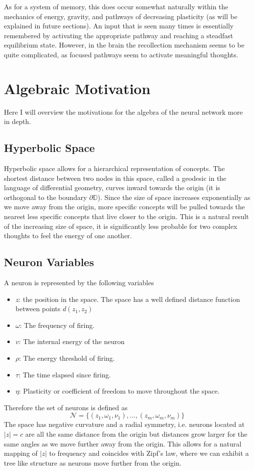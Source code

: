 \documentclass{article}
\begin{document}
As for a system of memory, this does occur somewhat naturally within the mechanics of energy, gravity, and pathways of decreasing plasticity (as will be explained in future sections). An input that is seen many times is essentially remembered by activating the appropriate pathway and reaching a steadfast equilibrium state. However, in the brain the recollection mechanism seems to be quite complicated, as focused pathways seem to activate meaningful thoughts.

\section{Algebraic Motivation}
Here I will overview the motivations for the algebra of the neural network more in depth.
\subsection{Hyperbolic Space}
Hyperbolic space allows for a hierarchical representation of concepts. The shortest distance between two nodes in this space, called a geodesic in the language of differential geometry, curves inward towards the origin (it is orthogonal to the boundary $\partial \mathbb{D}$). Since the size of space increases exponentially as we move away from the origin, more specific concepts will be pulled towards the nearest less specific concepts that live closer to the origin. This is a natural result of the increasing size of space, it is significantly less probable for two complex thoughts to feel the energy of one another.

\subsection{Neuron Variables}
A neuron is represented by the following variables
\begin{itemize}
    \item $z$: the position in the space. The space has a well defined distance function between points $d(z_1,z_2)$
    \item $\omega$: The frequency of firing.
    \item $v$: The internal energy of the neuron
    \item $\rho$: The energy threshold of firing.
    \item $\tau$: The time elapsed since firing.
    \item $\eta$: Plasticity or coefficient of freedom to move throughout the space.
\end{itemize}
Therefore the set of neurons is defined as 
\begin{equation}
    \mathcal{N} = \{ (z_1,\omega_1, \nu_1), ... ,(z_m,\omega_m, \nu_m) \}
\end{equation}
The space has negative curvature and a radial symmetry, i.e. neurons located at $|z| = c$ are all the same distance from the origin but distances grow larger for the same angles as we move further away from the origin. This allows for a natural mapping of $|z|$ to frequency and coincides with Zipf's law, where we can exhibit a tree like structure as neurons move further from the origin. 
\end{document}
